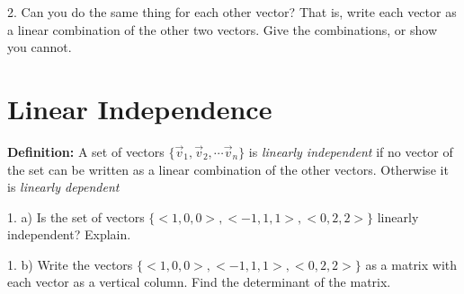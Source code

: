 \documentclass{article}
\begin{document}
\begin{flushleft}
2. Can you do the same thing for each other vector? That is, write each vector as a linear combination of the other two vectors. Give the combinations, or show you cannot.

\newpage
\section*{Linear Independence}
 \textbf{Definition:} A set of vectors $ \{ \vec{v}_1 , \vec{v}_2, \cdots \vec{v}_n \}$ is \textit{linearly independent} if no vector of the set can be written as a linear combination of the other vectors. Otherwise it is \textit{linearly dependent}

\vspace{0.1in}

1. a) Is the set of vectors $\{ <1,0,0>, <-1,1,1>, <0,2,2> \}$ linearly independent? Explain.

\vspace{1.5in}


1. b) Write the vectors $\{ <1,0,0>, <-1,1,1>, <0,2,2> \}$ as a matrix with each vector as a vertical column. Find the determinant of the matrix.

\vspace{1.5in}


\end{flushleft}
\end{document}
